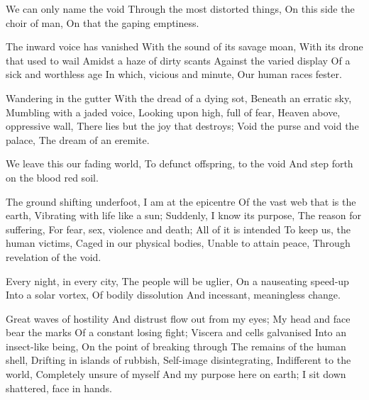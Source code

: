 \documentclass{article}
\newenvironment{stanza}{\begin{minipage}{10cm}\begin{internallinenumbers}\obeylines}{\end{internallinenumbers}\end{minipage}\vspace{\baselineskip}}
\begin{document}
\begin{stanza}
We can only name the void
Through the most distorted things,
On this side the choir of man,
On that the gaping emptiness.
\end{stanza}


\begin{stanza}
The inward voice has vanished
With the sound of its savage moan,
With its drone that used to wail
Amidst a haze of dirty scants
Against the varied display
Of a sick and worthless age
In which, vicious and minute,
Our human races fester.
\end{stanza}

\begin{stanza}
Wandering in the gutter
With the dread of a dying sot,
Beneath an erratic sky,
Mumbling with a jaded voice,
Looking upon high, full of fear,
Heaven above, oppressive wall,
There lies but the joy that destroys;
Void the purse and void the palace,
The dream of an eremite.
\end{stanza}

\begin{stanza}
We leave this our fading world,
To defunct offspring, to the void
And step forth on the blood red soil.
\end{stanza}


\begin{stanza}
The ground shifting underfoot,
I am at the epicentre
Of the vast web that is the earth,
Vibrating with life like a sun;
Suddenly, I know its purpose,
The reason for suffering,
For fear, sex, violence and death;
All of it is intended
To keep us, the human victims,
Caged in our physical bodies,
Unable to attain peace,
Through revelation of the void.
\end{stanza}

\begin{stanza}
Every night, in every city,
The people will be uglier,
On a nauseating speed-up
Into a solar vortex,
Of bodily dissolution
And incessant, meaningless change.
\end{stanza}

\begin{stanza}
Great waves of hostility
And distrust flow out from my eyes;
My head and face bear the marks
Of a constant losing fight;
Viscera and cells galvanised
Into an insect-like being,
On the point of breaking through
The remains of the human shell,
Drifting in islands of rubbish,
Self-image disintegrating,
Indifferent to the world,
Completely unsure of myself
And my purpose here on earth;
I sit down shattered, face in hands.
\end{stanza}
\end{document}
